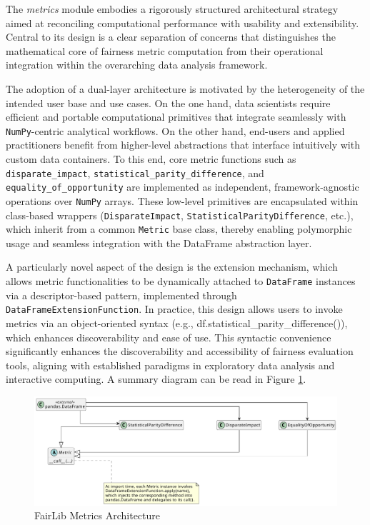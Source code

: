 \documentclass[12pt,a4paper,openright,twoside]{book}
\begin{document}
The \textit{metrics} module embodies a rigorously structured architectural strategy aimed at reconciling computational performance with usability and extensibility. Central to its design is a clear separation of concerns that distinguishes the mathematical core of fairness metric computation from their operational integration within the overarching data analysis framework.

The adoption of a dual-layer architecture is motivated by the heterogeneity of the intended user base and use cases. On the one hand, data scientists require efficient and portable computational primitives that integrate seamlessly with \texttt{NumPy}-centric analytical workflows. On the other hand, end-users and applied practitioners benefit from higher-level abstractions that interface intuitively with custom data containers. To this end, core metric functions such as \texttt{disparate\_impact}, \texttt{statistical\_parity\_difference}, and \texttt{equality\_of\_opportunity} are implemented as independent, framework-agnostic operations over \texttt{NumPy} arrays. These low-level primitives are encapsulated within class-based wrappers (\texttt{DisparateImpact}, \texttt{StatisticalParityDifference}, etc.), which inherit from a common \texttt{Metric} base class, thereby enabling polymorphic usage and seamless integration with the DataFrame abstraction layer.

A particularly novel aspect of the design is the extension mechanism, which allows metric functionalities to be dynamically attached to \texttt{DataFrame} instances via a descriptor-based pattern, implemented through \texttt{DataFrameExtensionFunction}. In practice, this design allows users to invoke metrics via an object-oriented syntax (e.g., df.statistical\_parity\_difference()), which enhances discoverability and ease of use. This syntactic convenience significantly enhances the discoverability and accessibility of fairness evaluation tools, aligning with established paradigms in exploratory data analysis and interactive computing. A summary diagram can be read in Figure \ref{fig:metrics-uml}.

\begin{figure}
\centering
\includegraphics[width=\textwidth]{figures/uml/metrics.pdf}
\caption{FairLib Metrics Architecture}
\label{fig:metrics-uml}
\end{figure}
\end{document}

